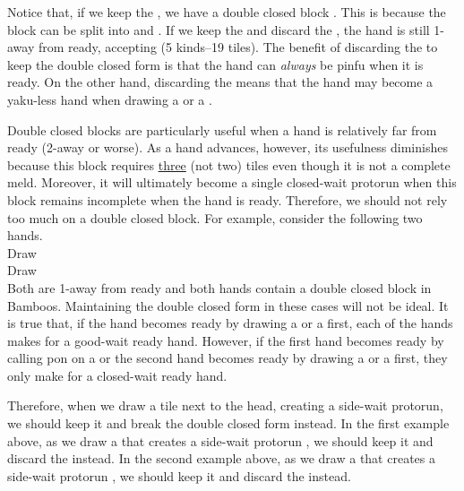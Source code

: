\bigskip
Notice that, if we keep the {\large{}}, we have a double closed block {\large{}}. This is because the block {\large{}} can be split into {\large{}} and {\large{}}. 
If we keep the {\large{}} and discard the {\large{}}, the hand is still 1-away from ready, accepting {\large{}} (5 kinds--19 tiles). The benefit of discarding the {\large{}} to keep the double closed form is that the hand can \emph{always} be {\jap pinfu} when it is ready. On the other hand, discarding the {\large{}} means that the hand may become a {\jap yaku}-less hand when drawing a {\large{}} or a {\large{}}.

\bigskip
Double closed blocks are particularly useful when a hand is relatively far from ready (2-away or worse). As a hand advances, however, its usefulness diminishes because this block requires \underline{three} (not two) tiles even though it is not a complete meld. 
Moreover, it will ultimately become a single closed-wait protorun when this block remains incomplete when the hand is ready. 
Therefore, we should not rely too much on a double closed block. 
For example, consider the following two hands. 
\bp
{}\zhong\zhong~\\
\hspace{290pt}\footnotesize{Draw}
\ep 
\vspace{-35pt}
\bp
{}~\\
\hspace{290pt}\footnotesize{Draw}\\
\ep
\vspace{-10pt}
Both are 1-away from ready and both hands contain a double closed block in Bamboos. Maintaining the double closed form in these cases will not be ideal. 
It is true that, if the hand becomes ready by drawing a {\large{}} or a {\large{}} first, each of the hands makes for a good-wait ready hand. However, if the first hand becomes ready by calling {\jap pon} on a {\large\zhong} or the second hand becomes ready by drawing a {\large{}} or a {\large{}} first, they only make for a closed-wait ready hand. 

\bigskip
Therefore, when we draw a tile next to the head, creating a side-wait protorun, we should keep it and break the double closed form instead. In the first example above, as we draw a {\large{}} that creates a side-wait protorun {\large{}}, we should keep it and discard the {\large{}} instead. In the second example above, as we draw a {\large{}} that creates a side-wait protorun {\large{}}, we should keep it and discard the {\large{}} instead. 

